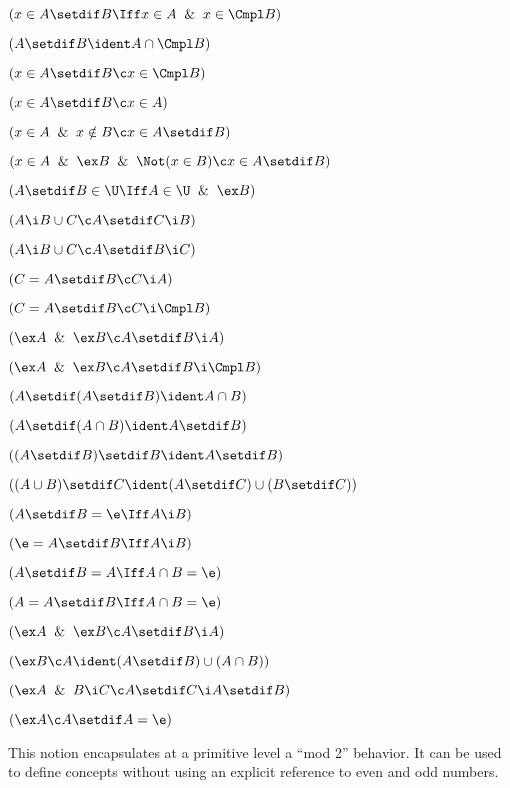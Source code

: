 $(x\in A\setdif B \Iff x \in A\And x\in \Cmpl B)$

 $(A \setdif B \ident A \cap \Cmpl B)$

 $(x \in A\setdif B \c x \in \Cmpl B)$

 $(x \in A\setdif B \c x \in A)$

 $(x \in A \And x \notin B \c x \in A\setdif B)$

 $(x \in A \And \ex B \And \Not (x\in B)\c x \in A \setdif B)$

 $(A \setdif B \in \U \Iff A \in \U \And \ex B)$

 $(A \i B \cup C \c A \setdif C \i B)$

 $(A \i B \cup C \c A \setdif B \i C)$

 $(C= A \setdif B \c C \i A)$

 $(C = A \setdif B \c C \i \Cmpl  B)$

 $(\ex A \And \ex B \c A \setdif B  \i A)$

 $(\ex A \And \ex B \c A \setdif B  \i \Cmpl B)$

 $(A \setdif (A \setdif B) \ident A \cap B)$

 $(A \setdif (A \cap B) \ident A \setdif B)$

 $((A \setdif B) \setdif B \ident A \setdif B)$

 $((A \cup B)\setdif C \ident (A \setdif C) \cup (B\setdif C))$

 $(A \setdif B = \e \Iff A \i B)$

 $(\e = A \setdif B\Iff A \i B)$

 $(A \setdif B  = A \Iff A \cap B = \e)$

 $(A = A \setdif B \Iff A \cap B = \e)$

 $(\ex A \And \ex B \c A \setdif B \i A)$

 $(\ex B \c A \ident (A \setdif B)\cup (A \cap B))$

 $(\ex A \And B \i C \c A \setdif C \i A \setdif B)$

 $(\ex A \c A \setdif A = \e)$

\lineb


This notion encapsulates at a primitive level a ``mod 2'' behavior.
It can be used to define concepts without using an explicit reference
to even and odd numbers.  
\lineb

